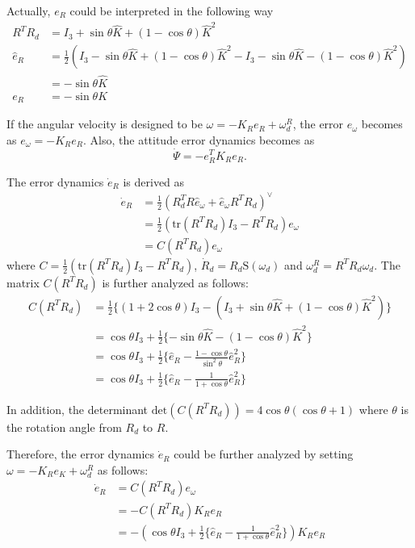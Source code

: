 \documentclass{article}
\begin{document}
Actually, $e_R$ could be interpreted in the following way
\begin{align}
R^TR_d &= I_3 + \sin\theta \hat{K} + (1-\cos\theta)\hat{K}^2 \nonumber \\
\hat{e}_R &= \frac{1}{2} (I_3 - \sin\theta \hat{K} + (1-\cos\theta)\hat{K}^2 - I_3 - \sin\theta \hat{K} -(1-\cos\theta)\hat{K}^2) \nonumber \\
&= -\sin\theta\hat{K} \nonumber \\
e_R &= -\sin\theta K \nonumber
\end{align}

If the angular velocity is designed to be $\omega = -K_Re_R + \omega_d^R$, the error $e_\omega$ becomes as $e_\omega = -K_Re_R$. Also, the attitude error dynamics becomes as
\begin{equation}
\dot{\Psi} = -e_R^TK_Re_R. \nonumber
\end{equation}

The error dynamics $\dot{e}_R$ is derived as
\begin{align}
\dot{e}_R &= \frac{1}{2}(R_d^T R \hat{e}_\omega +\hat{e}_\omega R^T R_d)^\vee \nonumber \\
&= \frac{1}{2}(\text{tr}(R^TR_d)I_3 - R^TR_d)e_\omega \nonumber \\
&= C(R^TR_d)e_\omega \nonumber
\end{align}
where $C =  \frac{1}{2}(\text{tr}(R^TR_d)I_3 - R^TR_d)$, $\dot{R}_d = R_d\text{S}(\omega_d)$ and $\omega_d^R = R^TR_d\omega_d$. 
The matrix $C(R^TR_d)$ is further analyzed as follows:
\begin{align}
C(R^TR_d) &= \frac{1}{2}\{(1+2\cos\theta)I_3 - (I_3 + \sin\theta\hat{K} + (1-\cos\theta)\hat{K}^2)\} \nonumber \\
&= \cos\theta I_3 +\frac{1}{2}\{-\sin\theta\hat{K} - (1-\cos\theta)\hat{K}^2\} \nonumber \\
&= \cos\theta I_3 +\frac{1}{2}\{ \hat{e}_R -\frac{1-\cos\theta}{\sin^2\theta}\hat{e}_R^2\} \nonumber \\
&= \cos\theta I_3 +\frac{1}{2}\{ \hat{e}_R -\frac{1}{1+\cos\theta}\hat{e}_R^2\} \nonumber
\end{align}

In addition, the determinant $\text{det}(C(R^TR_d)) = 4\cos\theta(\cos\theta + 1)$ where $\theta$ is the rotation angle from $R_d$ to $R$.

Therefore, the error dynamics $\dot{e}_R$ could be further analyzed by setting $\omega = -K_Re_K + \omega_d^R$ as follows:
\begin{align}
\dot{e}_R &= C(R^TR_d)e_\omega \nonumber \\
&= -C(R^TR_d)K_Re_R \nonumber \\
    &= -(\cos\theta I_3 + \frac{1}{2}\{\hat{e}_R - \frac{1}{1+\cos\theta}\hat{e}_R^2\})K_Re_R \nonumber
\end{align}
\end{document}

